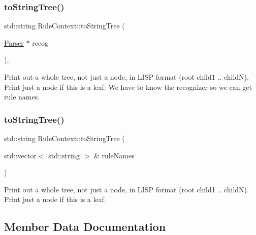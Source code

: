 \subsubsection{\texorpdfstring{to\+String\+Tree()}{toStringTree()}\hspace{0.1cm}{\footnotesize\ttfamily [1/2]}}
{\footnotesize\ttfamily std\+::string Rule\+Context\+::to\+String\+Tree (\begin{DoxyParamCaption}\item[{\hyperlink{classantlr4_1_1Parser}{Parser} $\ast$}]{recog }\end{DoxyParamCaption})\hspace{0.3cm}{\ttfamily [override]}, {\ttfamily [virtual]}}



Print out a whole tree, not just a node, in L\+I\+SP format (root child1 .. childN). Print just a node if this is a leaf. We have to know the recognizer so we can get rule names. 

\mbox{\label{classantlr4_1_1RuleContext_abcf82cbd07b59781b819a315a862c5a1}} 
\subsubsection{\texorpdfstring{to\+String\+Tree()}{toStringTree()}\hspace{0.1cm}{\footnotesize\ttfamily [2/2]}}
{\footnotesize\ttfamily std\+::string Rule\+Context\+::to\+String\+Tree (\begin{DoxyParamCaption}\item[{std\+::vector$<$ std\+::string $>$ \&}]{rule\+Names }\end{DoxyParamCaption})\hspace{0.3cm}{\ttfamily [virtual]}}



Print out a whole tree, not just a node, in L\+I\+SP format (root child1 .. childN). Print just a node if this is a leaf. 



\subsection{Member Data Documentation}
\mbox{\label{classantlr4_1_1RuleContext_a2c4b8b84636c681f98dcd86d5c5a8459}} 
